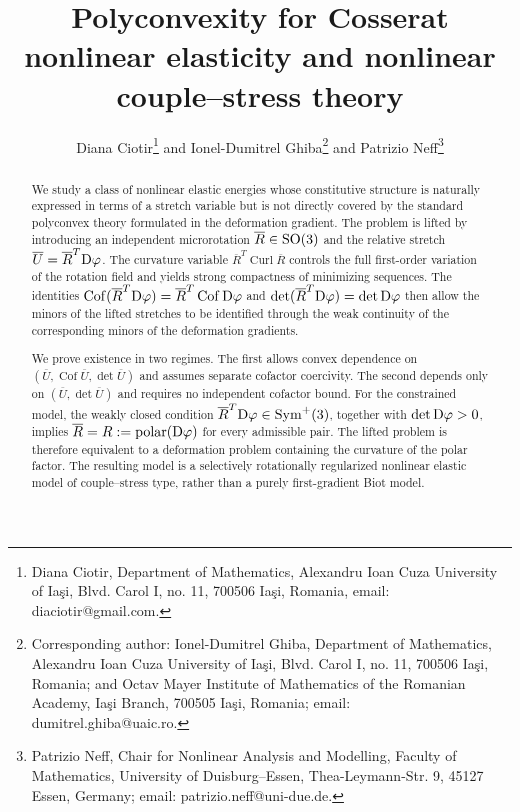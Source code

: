 \documentclass[11pt]{article}
\begin{document}
\title{Polyconvexity for Cosserat nonlinear elasticity and nonlinear couple--stress theory}

\author{Diana Ciotir\thanks{Diana Ciotir, Department of Mathematics, Alexandru Ioan Cuza University of Ia\c si, Blvd. Carol I, no. 11, 700506 Ia\c si, Romania, email: diaciotir@gmail.com.} \quad and \quad
Ionel-Dumitrel Ghiba\thanks{Corresponding author: Ionel-Dumitrel Ghiba, Department of Mathematics, Alexandru Ioan Cuza University of Ia\c si, Blvd. Carol I, no. 11, 700506 Ia\c si, Romania; and Octav Mayer Institute of Mathematics of the Romanian Academy, Ia\c si Branch, 700505 Ia\c si, Romania; email: dumitrel.ghiba@uaic.ro.} \quad and \quad
Patrizio Neff\thanks{Patrizio Neff, Chair for Nonlinear Analysis and Modelling, Faculty of Mathematics, University of Duisburg--Essen, Thea-Leymann-Str. 9, 45127 Essen, Germany; email: patrizio.neff@uni-due.de.}}

\maketitle

\begin{abstract}

We study a class of nonlinear elastic energies whose constitutive structure is naturally expressed in terms of a stretch variable but is not directly covered by the standard polyconvex theory formulated in the deformation gradient. The problem is lifted by introducing an independent microrotation $ \overline R \in {\rm SO}(3)$ and the relative stretch $ \overline U = \overline R ^T{\rm D}\varphi$. The curvature variable $  \overline R ^T\operatorname{Curl}  \overline R $ controls the full first-order variation of the rotation field and yields strong compactness of minimizing sequences.  The identities
$\operatorname{Cof}( \overline R^T{\rm D}\varphi)
 = \overline R^T\operatorname{Cof}{\rm D}\varphi$
and
$\det( \overline R^T{\rm D}\varphi)=\det{\rm D}\varphi$
then allow the minors of the lifted stretches to be identified through the
weak continuity of the corresponding minors of the deformation gradients.

We prove existence in two regimes. The first allows convex dependence on $(  \overline U ,\operatorname{Cof}  \overline U ,\det \overline U )$ and assumes separate cofactor coercivity. The second depends only on $( \overline U ,\det \overline U )$ and requires no independent cofactor bound. For the constrained model, the weakly closed condition $ \overline R ^T{\rm D}\varphi\in\operatorname{Sym}^{+}(3)$, together with $\det{\rm D}\varphi>0$, implies $ \overline R =R:=\operatorname{polar}({\rm D}\varphi)$ for every admissible pair. The lifted problem is therefore equivalent to a deformation problem containing the curvature of the polar factor. The resulting model is a selectively rotationally regularized nonlinear
elastic model of couple--stress type, rather than a purely first-gradient
Biot model.

\end{abstract}
\end{document}
